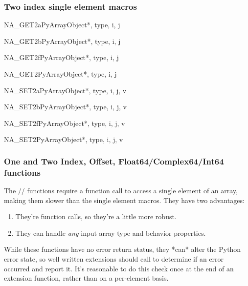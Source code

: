 \subsubsection{Two index single element macros}
\begin{cfuncdesc}{}{NA_GET2a}{PyArrayObject*, type, i, j}
\end{cfuncdesc}
\begin{cfuncdesc}{}{NA_GET2b}{PyArrayObject*, type, i, j}
\end{cfuncdesc}
\begin{cfuncdesc}{}{NA_GET2f}{PyArrayObject*, type, i, j}
\end{cfuncdesc}
\begin{cfuncdesc}{}{NA_GET2}{PyArrayObject*,  type, i, j}
\end{cfuncdesc}
\begin{cfuncdesc}{}{NA_SET2a}{PyArrayObject*, type, i, j, v}
\end{cfuncdesc}
\begin{cfuncdesc}{}{NA_SET2b}{PyArrayObject*, type, i, j, v}
\end{cfuncdesc}
\begin{cfuncdesc}{}{NA_SET2f}{PyArrayObject*, type, i, j, v}
\end{cfuncdesc}
\begin{cfuncdesc}{}{NA_SET2}{PyArrayObject*,  type, i, j, v}
\end{cfuncdesc}

\subsubsection{One and Two Index, Offset, Float64/Complex64/Int64 functions}

The // functions require a
function call to access a single element of an array, making them slower than
the single element macros.  They have two advantages:
\begin{enumerate}
\item They're function calls, so they're a little more robust. 
\item They can handle \emph{any} input array type and behavior properties.
\end{enumerate}


While these functions have no error return status, they *can* alter the Python
error state, so well written extensions should call
 to determine if an error occurred and report it.
It's reasonable to do this check once at the end of an extension function,
rather than on a per-element basis.


